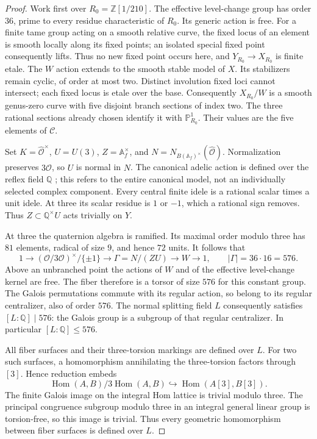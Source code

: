 \begin{proof}
Work first over $R_0=\mathbb Z[1/210]$. The effective level-change group
has order $36$, prime to every residue characteristic of $R_0$. Its generic
action is free. For a finite tame group acting on a smooth relative curve,
the fixed locus of an element is smooth locally along its fixed points;
an isolated special fixed point consequently lifts. Thus no new fixed
point occurs here, and $Y_{R_0}\to X_{R_0}$ is finite etale. The $W$ action
extends to the smooth stable model of $X$. Its stabilizers remain cyclic,
of order at most two. Distinct involution fixed loci cannot intersect;
each fixed locus is etale over the base. Consequently $X_{R_0}/W$ is a
smooth genus-zero curve with five disjoint branch sections of index two.
The three rational sections already chosen identify it with
$\mathbb P^1_{R_0}$. Their values are the five elements
of $\mathcal C$.

Set $K=\widehat{\mathcal O}^{\times}$, $U=U(3)$,
$Z=\mathbb A_f^\times$, and $N=N_{B(\mathbb A_f)^\times}
(\widehat{\mathcal O})$. Normalization preserves $3\widehat{\mathcal O}$,
so $U$ is normal in $N$. The canonical adelic action is defined over the
reflex field $\mathbb Q$ \cite[2.2.5 and 2.3.1]{Deligne1979}; this refers to the entire canonical model, not
an individually selected complex component. Every central finite idele
is a rational scalar times a unit idele. At three its scalar residue is
$1$ or $-1$, which a rational sign removes. Thus $Z\subset\mathbb Q^\times U$
acts trivially on $Y$.

At three the quaternion algebra is ramified. Its maximal order modulo
three has $81$ elements, radical of size $9$, and hence $72$ units.
It follows that
\[
 1\longrightarrow (\mathcal O/3\mathcal O)^\times/\{\pm1\}
 \longrightarrow\Gamma=N/(ZU)\longrightarrow W\longrightarrow1,
 \qquad |\Gamma|=36\cdot16=576.
\]
Above an unbranched point the actions of $W$ and of the effective
level-change kernel are free. The fiber therefore is a torsor of size
$576$ for this constant group. The Galois permutations commute with its
regular action, so belong to its regular centralizer, also of order
$576$. The normal splitting field $L$ consequently satisfies
$[L:\mathbb Q]\mid576$: the Galois group is a subgroup of that
regular centralizer. In particular $[L:\mathbb Q]\le576$.

All fiber surfaces and their three-torsion markings are defined over $L$.
For two such surfaces, a homomorphism annihilating the three-torsion
factors through $[3]$. Hence reduction embeds
\[
 \operatorname{Hom}(A,B)/3\operatorname{Hom}(A,B)
 \hookrightarrow\operatorname{Hom}(A[3],B[3]).
\]
The finite Galois image on the integral Hom lattice is trivial modulo
three. The principal congruence subgroup modulo three in an integral
general linear group is torsion-free, so this image is trivial. Thus
every geometric homomorphism between fiber surfaces is defined over $L$.


\end{proof}
